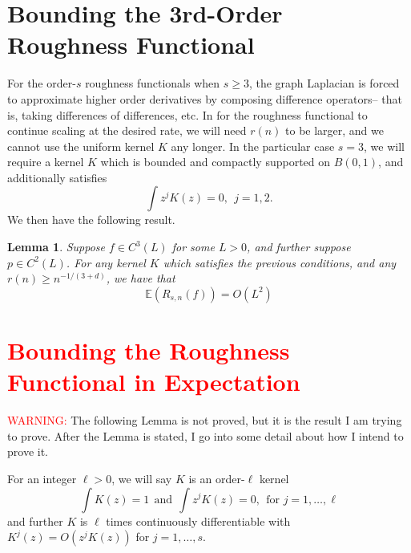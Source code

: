 \documentclass{article}
\newcommand{\1}{\mathbf{1}}
\newcommand{\Ebb}{\mathbb{E}}
\theoremstyle{alden}
\theoremstyle{aldenthm}
\newtheorem{lemma}{Lemma}
\theoremstyle{definition}
\theoremstyle{remark}
\begin{document}
\section{Bounding the 3rd-Order Roughness Functional}

For the order-$s$ roughness functionals when $s \geq 3$, the graph Laplacian is forced to approximate higher order derivatives by composing difference operators-- that is, taking differences of differences, etc. In for the roughness functional to continue scaling at the desired rate, we will need $r(n)$ to be larger, and we cannot use the uniform kernel $K$ any longer. In the particular case $s = 3$, we will require a kernel $K$ which is bounded and compactly supported on $B(0,1)$, and additionally satisfies
\begin{equation*}
\int z^j K(z) = 0,~~\textrm{$j = 1,2$.}
\end{equation*}
We then have the following result.
\begin{lemma}
	\label{lem:3rd_order_roughness_functional}
	Suppose $f \in C^{3}(L)$ for some $L > 0$, and further suppose $p \in C^{2}(L)$. For any kernel $K$ which satisfies the previous conditions, and any $r(n) \geq n^{-1/(3+d)}$, we have that
	\begin{equation*}
	\Ebb(R_{s,n}(f)) = O(L^2)
	\end{equation*} 
\end{lemma}

\section{\textcolor{red}{Bounding the Roughness Functional in Expectation}}

\textcolor{red}{WARNING:} The following Lemma is not proved, but it is the result I am trying to prove. After the Lemma is stated, I go into some detail about how I intend to prove it. 

For an integer $\ell > 0$, we will say $K$ is an order-$\ell$ kernel
\begin{equation*}
\int K(z) = 1 ~~\textrm{and}~~\int z^j K(z) = 0,~~\textrm{for $j = 1,\ldots,\ell$}
\end{equation*}
and further $K$ is $\ell$ times continuously differentiable with $K^{j}(z) = O(z^j K(z))$ for $j = 1,\ldots,s$.
\end{document}

